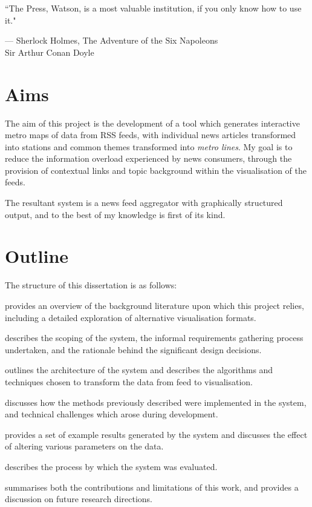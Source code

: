 \epigraph{``The Press, Watson, is a most valuable institution, if you only know how to use it."}{--- \textup{Sherlock Holmes}, The Adventure of the Six Napoleons\\[0.2cm] \textup{Sir Arthur Conan Doyle}}

\section*{Aims}
The aim of this project is the development of a tool which generates interactive metro maps of data from RSS feeds, with individual news articles transformed into stations and common themes transformed into \textit{metro lines}. My goal is to reduce the information overload experienced by news consumers, through the provision of contextual links and topic background within the visualisation of the feeds.

The resultant system is a news feed aggregator with graphically structured output, and to the best of my knowledge is first of its kind.

\section*{Outline}

The structure of this dissertation is as follows:
\begin{description}[leftmargin=6em,style=nextline]
	\item [Chapter 1] provides an overview of the background literature upon which this project relies, including a detailed exploration of alternative visualisation formats.
	\item [Chapter 2] describes the scoping of the system, the informal requirements gathering process undertaken, and the rationale behind the significant design decisions.
	\item [Chapter 3] outlines the architecture of the system and describes the algorithms and techniques chosen to transform the data from feed to visualisation.
	\item [Chapter 4] discusses how the methods previously described were implemented in the system, and technical challenges which arose during development.
	\item [Chapter 5] provides a set of example results generated by the system and discusses the effect of altering various parameters on the data.
	\item [Chapter 6] describes the process by which the system was evaluated.
	\item [Chapter 7] summarises both the contributions and limitations of this work, and provides a discussion on future research directions.
\end{description}

